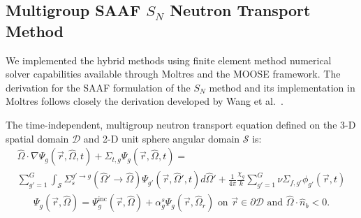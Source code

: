 \documentclass[letterpaper]{mc2025}
\begin{document}
\subsection{Multigroup \Gls{SAAF} $S_N$ Neutron Transport Method} \label{sec:saaf}

We implemented the hybrid methods using finite element method numerical solver capabilities available through
Moltres \cite{lindsay_introduction_2018} and the \gls*{MOOSE} framework.
The derivation for the \gls*{SAAF} formulation of the $S_N$ method and its
implementation in Moltres follows closely the derivation developed by Wang et al.\
\cite{wang_diffusion_2014}.

The time-independent, multigroup neutron transport equation defined on the 3-D spatial domain
$\mathcal{D}$ and 2-D unit sphere angular domain $\mathcal{S}$ is:
%
\begin{multline}
  \hat{\Omega}\cdot\nabla\Psi_g(\vec{r},\hat{\Omega},t) + \Sigma_{t,g}
  \Psi_g(\vec{r},\hat{\Omega},t) = \\
  \sum^G_{g'=1}\int_\mathcal{S} \Sigma_s^{g'\rightarrow g}(\hat{\Omega}'\rightarrow\hat{\Omega})
  \Psi_{g'}(\vec{r},\hat{\Omega}',t)d\hat{\Omega}'
  + \frac{1}{4\pi}\frac{\chi_{g}}{k}\sum^G_{g'=1} \nu\Sigma_{f,g'} \phi_{g'}(\vec{r},t)
  \label{eq:mg-nte}
\end{multline}
%
\begin{gather}
  \Psi_g(\vec{r},\hat{\Omega}) = \Psi^\text{inc}_g(\vec{r},\hat{\Omega}) +
  \alpha^s_g\Psi_g(\vec{r},\hat{\Omega}_r)
  \mbox{ on } \vec{r} \in \partial\mathcal{D} \mbox{ and } \hat{\Omega}\cdot\hat{n}_b < 0.
  \label{eq:mg-nte-bc}
\end{gather}
\end{document}
